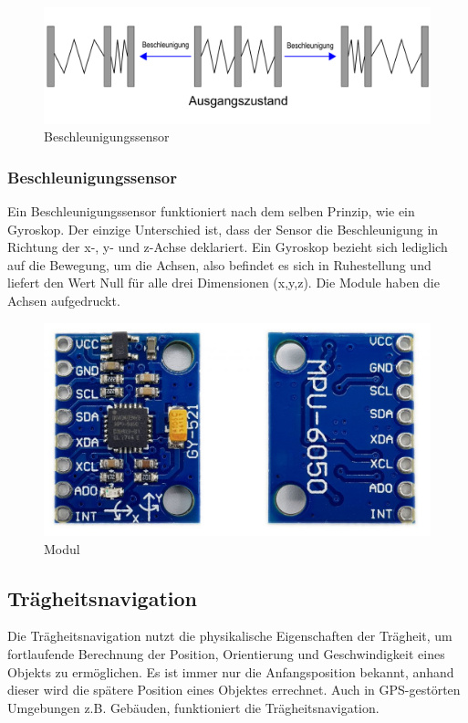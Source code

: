 \begin{figure}[H]
	\centering
	\includegraphics[width=0.7\linewidth]{images/Beschleunigungssensor.png}
	\caption[Beschleunigungssensor]{Beschleunigungssensor}
	\label{fig:Beschleunigungssensor}
\end{figure}

\subsubsection{Beschleunigungssensor}

Ein Beschleunigungssensor funktioniert nach dem selben Prinzip, wie ein Gyroskop. Der einzige Unterschied ist, dass der Sensor die Beschleunigung in Richtung der x-, y- und z-Achse deklariert. Ein Gyroskop bezieht sich lediglich auf die Bewegung, um die Achsen, also befindet es sich in Ruhestellung und liefert den Wert Null für alle drei Dimensionen (x,y,z). \textcite{MPU6050} Die Module haben die Achsen aufgedruckt.

\begin{figure}[H]
	\centering
	\includegraphics[width=0.7\linewidth]{images/Modul.jpg}
	\caption[Modul]{Modul}
	\label{fig:Modul}
\end{figure}

\subsection{Trägheitsnavigation}

Die Trägheitsnavigation nutzt die physikalische Eigenschaften der Trägheit, um fortlaufende Berechnung der Position, Orientierung und Geschwindigkeit eines Objekts zu ermöglichen. \parencite{Traegheitsnavigation} Es ist immer nur die Anfangsposition bekannt, anhand dieser wird die spätere Position eines Objektes errechnet. Auch in GPS-gestörten Umgebungen z.B. Gebäuden, funktioniert die Trägheitsnavigation. 


